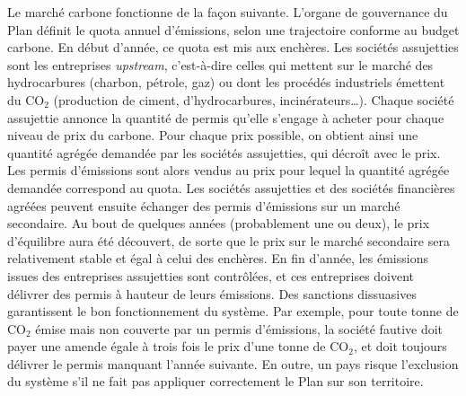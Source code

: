 \documentclass[a5paper,french,openany]{memoir}
\begin{document}
Le marché carbone fonctionne de la façon suivante. 
L'organe de gouvernance du Plan définit le quota annuel d'émissions, selon une trajectoire conforme au budget carbone. En début d'année, ce quota est mis aux enchères. %
Les sociétés assujetties sont les entreprises \textit{upstream}, c'est-à-dire celles qui mettent sur le marché des hydrocarbures (charbon, pétrole, gaz) ou dont les procédés industriels émettent du CO$_\text{2}$ (production de ciment, d'hydrocarbures, incinérateurs\dots). 
Chaque société assujettie annonce la quantité de permis qu'elle s'engage à acheter pour chaque niveau de prix du carbone. Pour chaque prix possible, on obtient ainsi une quantité agrégée demandée par les sociétés assujetties, qui décroît avec le prix. Les permis d'émissions sont alors vendus au prix pour lequel la quantité agrégée demandée correspond au quota. Les sociétés assujetties et des sociétés financières agréées peuvent ensuite échanger des permis d'émissions sur un marché secondaire. Au bout de quelques années (probablement une ou deux), le prix d'équilibre aura été découvert, de sorte que le prix sur le marché secondaire sera relativement stable et égal à celui des enchères. En fin d'année, les émissions issues des entreprises assujetties sont contrôlées, et ces entreprises doivent délivrer des permis à hauteur de leurs émissions. %
Des sanctions dissuasives garantissent le bon fonctionnement du système. Par exemple, pour toute tonne de CO$_\text{2}$ émise mais non couverte par un permis d'émissions, la société fautive doit payer une amende égale à trois fois le prix d'une tonne de CO$_\text{2}$, et doit toujours délivrer le permis manquant l'année suivante. En outre, un pays risque l'exclusion du système s'il ne fait pas appliquer correctement le Plan sur son territoire. %
\end{document}
